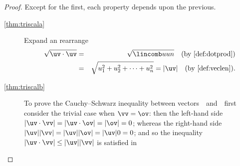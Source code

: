 \begin{proof} 
Except for the first, each property depends upon the previous.
\begin{description}
\item[\ref{thm:triscala}]
Expand an rearrange
\begin{eqnarray*}
\sqrt{\uv\cdot\uv}&=&\sqrt{\lincomb uun}\quad(\text{by \cref{def:dotprod}})
\\&=&\sqrt{u_1^2+u_2^2+\cdots+u_n^2}
=|\uv|\quad(\text{by \cref{def:veclen}}).
\end{eqnarray*}

\item[\ref{thm:triscalb}]  
To prove the Cauchy--Schwarz inequality between vectors~\uv\ and~\vv\ first consider the trivial case when \(\vv=\ov\): then the left-hand side \(|\uv\cdot\vv|=|\uv\cdot\ov|=|\ov|=0\); whereas the right-hand side \(|\uv||\vv|=|\uv||\ov|=|\uv|0=0\); and so the inequality \(|\uv\cdot\vv|\leq|\uv||\vv|\) is satisfied in 


\end{description}
\end{proof}
